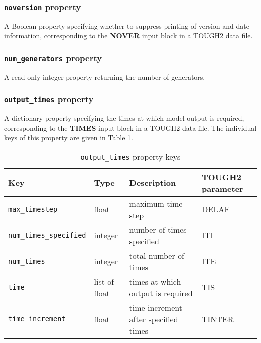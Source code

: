 \begin{snugshade}
\subsubsection{\texttt{noversion} property}
\end{snugshade}
\label{sec:t2data:noversion}

A Boolean property specifying whether to suppress printing of version and date information, corresponding to the \textbf{NOVER} input block in a TOUGH2 data file.

\begin{snugshade}
\subsubsection{\texttt{num\_generators} property}
\end{snugshade}
\label{sec:t2data:num_generators}

A read-only integer property returning the number of generators.

\begin{snugshade}
\subsubsection{\texttt{output\_times} property}
\end{snugshade}
\label{sec:t2data:output_times}

A dictionary property specifying the times at which model output is required, corresponding to the \textbf{TIMES} input block in a TOUGH2 data file.  The individual keys of this property are given in Table \ref{tb:outputtimes}.

\begin{table}
  \begin{center}
    \begin{tabular}{|l|l|l|p{20mm}|}
      \hline
      \textbf{Key} & \textbf{Type} & \textbf{Description} & \textbf{TOUGH2 parameter}\\
      \hline
      \texttt{max\_timestep} & float & maximum time step & DELAF\\
      \texttt{num\_times\_specified} & integer & number of times specified & ITI\\
      \texttt{num\_times} & integer & total number of times & ITE\\
      \texttt{time} & list of float & times at which output is required & TIS\\
      \texttt{time\_increment} & float & time increment after specified times & TINTER\\
      \hline
    \end{tabular}
    \caption{\texttt{output\_times} property keys}
    \label{tb:outputtimes}
  \end{center}
\end{table}


